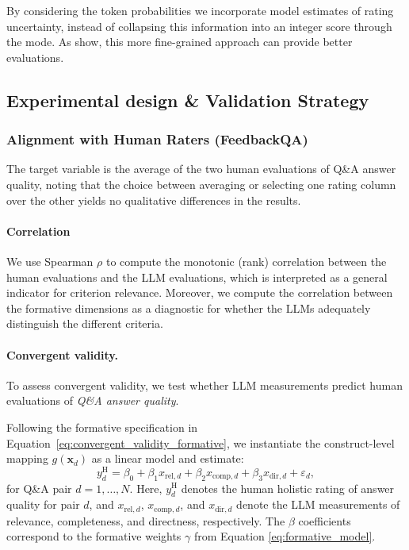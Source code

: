 By considering the token probabilities we incorporate model estimates of rating uncertainty, instead of collapsing this information into an integer score through the mode. As \citet{liu_g-eval_2023} show, this more fine-grained approach can provide better evaluations. 


\subsection{Experimental design \& Validation Strategy}

\subsubsection{Alignment with Human Raters (FeedbackQA)}

The target variable is the average of the two human evaluations of Q\&A answer quality, noting that the choice between averaging or selecting one rating column over the other yields no qualitative differences in the results.

\paragraph{Correlation}
We use Spearman $\rho$ to compute the monotonic (rank) correlation between the human evaluations and the LLM evaluations, which is interpreted as a general indicator for criterion relevance. Moreover, we compute the correlation between the formative dimensions as a diagnostic for whether the LLMs adequately distinguish the different criteria.  

\paragraph{Convergent validity.}
To assess convergent validity, we test whether LLM measurements predict human evaluations of \textit{Q\&A answer quality}.

Following the formative specification in Equation~\ref{eq:convergent_validity_formative}, we instantiate the construct-level mapping $g(\mathbf{x}_d)$ as a linear model and estimate:
\begin{equation}\label{eq:feedbackqa_formative_regression}
    y^{\text{H}}_d
    = \beta_0
    + \beta_1 x_{\text{rel},d}
    + \beta_2 x_{\text{comp},d}
    + \beta_3 x_{\text{dir},d}
    + \varepsilon_d,
\end{equation}
for Q\&A pair $d = 1,\dots,N$. Here, $y^{\text{H}}_d$ denotes the human holistic rating of answer quality for pair $d$, and $x_{\text{rel},d}$, $x_{\text{comp},d}$, and $x_{\text{dir},d}$ denote the LLM measurements of relevance, completeness, and directness, respectively. The $\beta$ coefficients correspond to the formative weights $\gamma$ from Equation \ref{eq:formative_model}.


